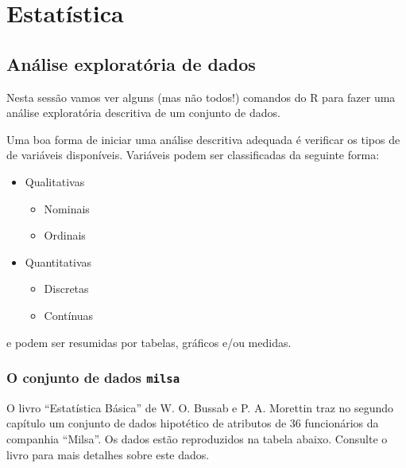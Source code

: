 \documentclass[10pt,a4paper]{book}
\providecommand{\tightlist}{%
  \setlength{\itemsep}{0pt}\setlength{\parskip}{0pt}}
\begin{document}
\part{Estatística}\label{part-estatuxedstica}

\chapter{Análise exploratória de
dados}\label{anuxe1lise-exploratuxf3ria-de-dados}

Nesta sessão vamos ver alguns (mas não todos!) comandos do R para fazer
uma análise exploratória descritiva de um conjunto de dados.

Uma boa forma de iniciar uma análise descritiva adequada é verificar os
tipos de de variáveis disponíveis. Variáveis podem ser classificadas da
seguinte forma:

\begin{itemize}
\tightlist
\item
  Qualitativas

  \begin{itemize}
  \tightlist
  \item
    Nominais
  \item
    Ordinais
  \end{itemize}
\item
  Quantitativas

  \begin{itemize}
  \tightlist
  \item
    Discretas
  \item
    Contínuas
  \end{itemize}
\end{itemize}

e podem ser resumidas por tabelas, gráficos e/ou medidas.

\section{\texorpdfstring{O conjunto de dados
\texttt{milsa}}{O conjunto de dados milsa}}\label{o-conjunto-de-dados-milsa}

O livro ``Estatística Básica'' de W. O. Bussab e P. A. Morettin traz no
segundo capítulo um conjunto de dados hipotético de atributos de 36
funcionários da companhia ``Milsa''. Os dados estão reproduzidos na
tabela abaixo. Consulte o livro para mais detalhes sobre este dados.
\end{document}
